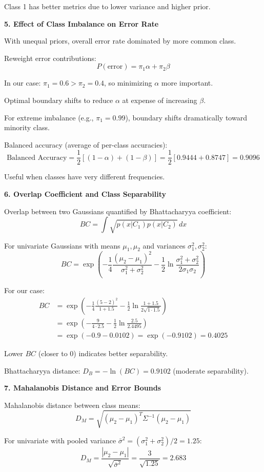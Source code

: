 \documentclass[12pt]{article}
\begin{document}
\begin{explanation}
Class 1 has better metrics due to lower variance and higher prior.

\textbf{5. Effect of Class Imbalance on Error Rate}

With unequal priors, overall error rate dominated by more common class.

Reweight error contributions:
\[P(\text{error}) = \pi_1 \alpha + \pi_2 \beta\]

In our case: $\pi_1 = 0.6 > \pi_2 = 0.4$, so minimizing $\alpha$ more important.

Optimal boundary shifts to reduce $\alpha$ at expense of increasing $\beta$.

For extreme imbalance (e.g., $\pi_1 = 0.99$), boundary shifts dramatically toward minority class.

Balanced accuracy (average of per-class accuracies):
\[\text{Balanced Accuracy} = \frac{1}{2}[(1-\alpha) + (1-\beta)] = \frac{1}{2}[0.9444 + 0.8747] = 0.9096\]

Useful when classes have very different frequencies.

\textbf{6. Overlap Coefficient and Class Separability}

Overlap between two Gaussians quantified by Bhattacharyya coefficient:
\[BC = \int \sqrt{p(x|C_1) p(x|C_2)} \, dx\]

For univariate Gaussians with means $\mu_1, \mu_2$ and variances $\sigma_1^2, \sigma_2^2$:
\[BC = \exp\left(-\frac{1}{4} \frac{(\mu_2 - \mu_1)^2}{\sigma_1^2 + \sigma_2^2} - \frac{1}{2}\ln\frac{\sigma_1^2 + \sigma_2^2}{2\sigma_1\sigma_2}\right)\]

For our case:
\begin{align*}
BC &= \exp\left(-\frac{1}{4} \frac{(5-2)^2}{1 + 1.5} - \frac{1}{2}\ln\frac{1 + 1.5}{2\sqrt{1 \cdot 1.5}}\right) \\
&= \exp\left(-\frac{9}{4 \cdot 2.5} - \frac{1}{2}\ln\frac{2.5}{2.4495}\right) \\
&= \exp(-0.9 - 0.0102) = \exp(-0.9102) = 0.4025
\end{align*}

Lower $BC$ (closer to 0) indicates better separability.

Bhattacharyya distance: $D_B = -\ln(BC) = 0.9102$ (moderate separability).

\textbf{7. Mahalanobis Distance and Error Bounds}

Mahalanobis distance between class means:
\[D_M = \sqrt{(\mu_2 - \mu_1)^T \Sigma^{-1} (\mu_2 - \mu_1)}\]

For univariate with pooled variance $\bar{\sigma}^2 = (\sigma_1^2 + \sigma_2^2)/2 = 1.25$:
\[D_M = \frac{|\mu_2 - \mu_1|}{\sqrt{\bar{\sigma}^2}} = \frac{3}{\sqrt{1.25}} = 2.683\]


\end{explanation}
\end{document}
